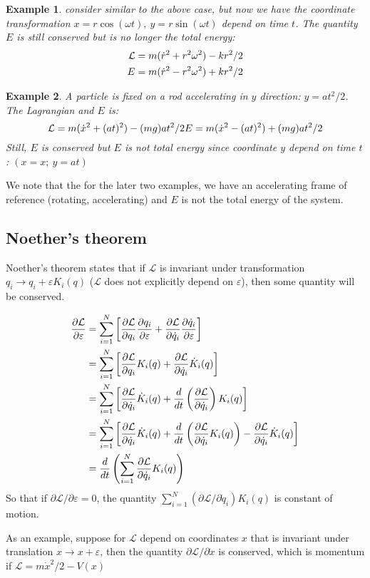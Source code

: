 \documentclass{article}
\newcommand{\pfrac}[2]{\frac{\partial #1}{\partial #2}}
\newcommand{\ddt}[1]{\frac{d}{dt}\left( #1 \right)}
\renewcommand{\L}{\mathcal{L}}
\newcommand{\dotx}{\dot{x}}
\newcommand{\dotq}{\dot{q}}
\newtheorem{example}{Example}
\begin{document}
\begin{example}
consider similar to the above case, but now we have the coordinate transformation 
$x = r\cos(\omega t),\ y = r\sin(\omega t)$ depend on time $t$. The quantity
$E$ is still conserved but is no longer the total energy:
\begin{align}
    \L = m(\dot{r}^2 + r^2\omega^2) - kr^2/2 \notag \\
    E = m(\dot{r}^2 - r^2\omega^2) + kr^2/2 \notag
\end{align}
\end{example}

\begin{example}
A particle is fixed on a rod accelerating in $y$ direction: $y = at^2 / 2$. The 
Lagrangian and $E$ is:
\begin{equation}
    \L = m(\dotx^2 + (at)^2 ) - (mg)at^2 / 2 \notag \\
    E = m(\dotx^2 - (at)^2 ) + (mg)at^2 / 2 \notag 
\end{equation}
Still, $E$ is conserved but $E$ is not total energy since coordinate $y$ depend on 
time $t$: $(x = x;\ y = a t)$
\end{example}

We note that the for the later two examples, we have an accelerating frame of reference (rotating, accelerating) and 
$E$ is not the total energy of the system.


\subsection{Noether's theorem}
Noether's theorem states that if $\L$ is invariant under transformation 
$q_i \to q_i + \varepsilon K_i(q) $ ($\L$ does not explicitly depend on $\varepsilon$), 
then some quantity will be conserved.

\begin{align}
    \pfrac{\L}{\varepsilon} 
    &= \sum_{i=1}^{N} \left[ \pfrac{\L}{q_i}\pfrac{q_i}{\varepsilon} + \pfrac{\L}{\dotq_i}\pfrac{\dotq_i}{\varepsilon} \right] \notag \\
    &= \sum_{i=1}^{N} \left[ \pfrac{\L}{q_i} K_i(q) + \pfrac{\L}{\dotq_i} \dot{K}_i(q) \right] \notag \\
    &= \sum_{i=1}^{N} \left[ \pfrac{\L}{\dotq_i} \dot{K}_i(q) + \ddt{\pfrac{\L}{\dotq_i}}K_i(q) \right] \notag \\
    &= \sum_{i=1}^{N} \left[ \pfrac{\L}{\dotq_i} \dot{K}_i(q) + \ddt{\pfrac{\L}{\dotq_i}K_i(q)} - \pfrac{\L}{\dotq_i}\dot{K}_i(q)  \right] \notag \\
    &= \ddt{ \sum_{i=1}^{N} \pfrac{\L}{\dotq_i}K_i(q) }
\end{align}
So that if $\partial \L / \partial \varepsilon = 0$, the quantity $\sum_{i=1}^{N} (\partial \L / \partial \dotq_i) K_i(q) $ is constant of motion.

As an example, suppose for $\L$ depend on coordinates $x$ that is invariant under translation $x \to x + \varepsilon$,
then the quantity $\partial \L / \partial \dotx$ is conserved, which is momentum if $\L = m\dotx^2 / 2 - V(x)$
\end{document}
